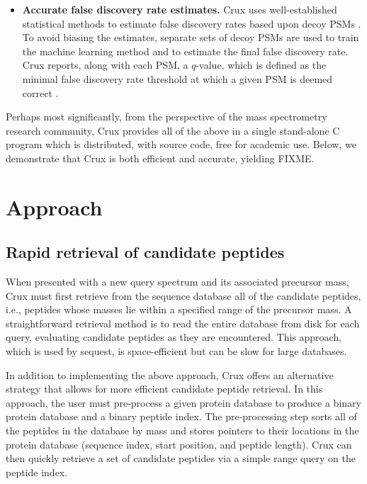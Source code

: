 \documentclass{bioinfo}
\renewcommand{\cite}{\citep}
\begin{document}
\begin{itemize}
\item {\bf Accurate false discovery rate estimates.}  Crux uses
  well-established statistical methods to estimate false discovery
  rates based upon decoy PSMs \cite{benjamini:controlling}.  To avoid
  biasing the estimates, separate sets of decoy PSMs are used to train
  the machine learning method and to estimate the final false
  discovery rate.  Crux reports, along with each PSM, a $q$-value,
  which is defined as the minimal false discovery rate threshold at
  which a given PSM is deemed correct \cite{storey:statistical}.

\end{itemize}

Perhaps most significantly, from the perspective of the mass
spectrometry research community, Crux provides all of the above in a
single stand-alone C program which is distributed, with source code,
free for academic use.  Below, we demonstrate that Crux is both
efficient and accurate, yielding FIXME.

\section{Approach}

\subsection{Rapid retrieval of candidate peptides}

When presented with a new query spectrum and its associated precursor
mass, Crux must first retrieve from the sequence database all of the
candidate peptides, i.e., peptides whose masses lie within a specified
range of the precursor mass.  A straightforward retrieval method is to
read the entire database from disk for each query, evaluating
candidate peptides as they are encountered.  This approach, which is
used by {\sc sequest}, is space-efficient but can be slow for large
databases.

In addition to implementing the above approach, Crux offers an
alternative strategy that allows for more efficient candidate peptide
retrieval.  In this approach, the user must pre-process a given
protein database to produce a binary protein database and a binary
peptide index.  The pre-processing step sorts all of the peptides in
the database by mass and stores pointers to their locations in the
protein database (sequence index, start position, and peptide length).
Crux can then quickly retrieve a set of candidate peptides via a
simple range query on the peptide index.
\end{document}

